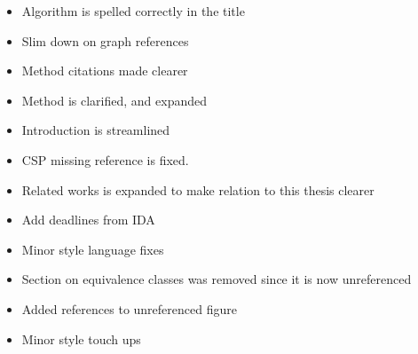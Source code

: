 \documentclass[msc,lith,english]{liuthesis}
\begin{document}
\begin{itemize}
  \item Algorithm is spelled correctly in the title
  \item Slim down on graph references
  \item Method citations made clearer
  \item Method is clarified, and expanded
  \item Introduction is streamlined
  \item CSP missing reference is fixed. 
  \item Related works is expanded to make relation to this thesis clearer
  \item Add deadlines from IDA
  \item Minor style language fixes
  \item Section on equivalence classes was removed since it is now unreferenced
  \item Added references to unreferenced figure
  \item Minor style touch ups
\end{itemize}
\end{document}
